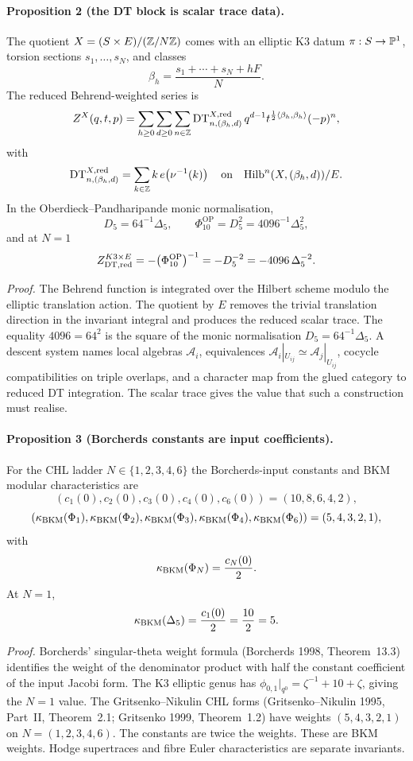 \paragraph{Proposition 2 (the DT block is scalar trace data).}
The quotient $X=(S\times E)/(\mathbb{Z}/N\mathbb{Z})$ comes with an elliptic K3 datum
$\pi:S\to\mathbb{P}^{1}$, torsion sections $s_1,\ldots,s_N$, and classes
\[
\beta_h=\frac{s_1+\cdots+s_N+hF}{N}.
\]
The reduced Behrend-weighted series is
\[
Z^X(q,t,p)
=\sum_{h\geq0}\sum_{d\geq0}\sum_{n\in\mathbb{Z}}
\mathrm{DT}^{X,\mathrm{red}}_{n,(\beta_h,d)}\,q^{d-1}
t^{\frac12\langle\beta_h,\beta_h\rangle}(-p)^n,
\]
with
\[
\mathrm{DT}^{X,\mathrm{red}}_{n,(\beta_h,d)}
=\sum_{k\in\mathbb{Z}}k\,e\!\left(\nu^{-1}(k)\right)
\quad\text{on}\quad
\mathrm{Hilb}^n(X,(\beta_h,d))/E .
\]
In the Oberdieck--Pandharipande monic normalisation,
\[
D_5=64^{-1}\Delta_5,\qquad
\Phi_{10}^{\mathrm{OP}}=D_5^2=4096^{-1}\Delta_5^2,
\]
and at $N=1$
\[
Z^{K3\times E}_{\mathrm{DT},\mathrm{red}}
=-\bigl(\Phi_{10}^{\mathrm{OP}}\bigr)^{-1}
=-D_5^{-2}
=-4096\,\Delta_5^{-2}.
\]

\emph{Proof.}
The Behrend function is integrated over the Hilbert scheme modulo the
elliptic translation action. The quotient by $E$ removes the trivial
translation direction in the invariant integral and produces the
reduced scalar trace. The equality
$4096=64^2$ is the square of the monic normalisation
$D_5=64^{-1}\Delta_5$. A descent system names local
algebras $\mathcal A_i$, equivalences
$\mathcal A_i|_{U_{ij}}\simeq\mathcal A_j|_{U_{ij}}$, cocycle
compatibilities on triple overlaps, and a character map from the glued
category to reduced DT integration. The scalar trace gives the value
that such a construction must realise.

\paragraph{Proposition 3 (Borcherds constants are input coefficients).}
For the CHL ladder $N\in\{1,2,3,4,6\}$ the Borcherds-input constants and
BKM modular characteristics are
\[
(c_1(0),c_2(0),c_3(0),c_4(0),c_6(0))=(10,8,6,4,2),
\]
\[
(\kappa_{\mathrm{BKM}}(\Phi_1),\kappa_{\mathrm{BKM}}(\Phi_2),\kappa_{\mathrm{BKM}}(\Phi_3),
\kappa_{\mathrm{BKM}}(\Phi_4),\kappa_{\mathrm{BKM}}(\Phi_6))=(5,4,3,2,1),
\]
with
\[
\kappa_{\mathrm{BKM}}(\Phi_N)=\frac{c_N(0)}2 .
\]
At $N=1$,
\[
\kappa_{\mathrm{BKM}}(\Delta_5)=\frac{c_1(0)}2=\frac{10}{2}=5.
\]

\emph{Proof.}
Borcherds' singular-theta weight formula (Borcherds 1998,
Theorem~13.3) identifies the weight of the denominator product with
half the constant coefficient of the input Jacobi form. The K3 elliptic
genus has
$\phi_{0,1}|_{q^0}=\zeta^{-1}+10+\zeta$, giving the $N=1$ value.
The Gritsenko--Nikulin CHL forms (Gritsenko--Nikulin 1995, Part~II,
Theorem~2.1; Gritsenko 1999, Theorem~1.2) have weights
$(5,4,3,2,1)$ on $N=(1,2,3,4,6)$. The constants are twice the weights.
These are BKM weights. Hodge supertraces and fibre Euler
characteristics are separate invariants.

